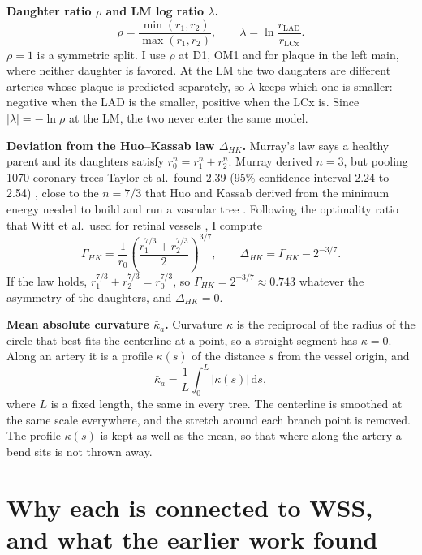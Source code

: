 \documentclass[11pt,a4paper]{article}
\begin{document}
\textbf{Daughter ratio $\rho$ and LM log ratio $\lambda$.}
\begin{equation}
  \rho = \frac{\min(r_1, r_2)}{\max(r_1, r_2)}, \qquad
  \lambda = \ln\frac{r_\mathrm{LAD}}{r_\mathrm{LCx}}.
  \label{eq:ratios}
\end{equation}
$\rho = 1$ is a symmetric split.
I use $\rho$ at D1, OM1 and for plaque in the left main, where neither daughter is favored.
At the LM the two daughters are different arteries whose plaque is predicted separately, so $\lambda$ keeps which one is smaller: negative when the LAD is the smaller, positive when the LCx is.
Since $\lvert\lambda\rvert = -\ln\rho$ at the LM, the two never enter the same model.

\textbf{Deviation from the Huo--Kassab law $\Delta_{HK}$.} Murray's law says a healthy parent and its daughters satisfy $r_0^n = r_1^n + r_2^n$.
Murray derived $n = 3$, but pooling 1070 coronary trees Taylor et al.\ found 2.39 (95\% confidence interval 2.24 to 2.54) \cite{taylor2024murray}, close to the $n = 7/3$ that Huo and Kassab derived from the minimum energy needed to build and run a vascular tree \cite{huo2012scaling}.
Following the optimality ratio that Witt et al.\ used for retinal vessels \cite{witt2010optimality}, I compute
\begin{equation}
  \Gamma_{HK} = \frac{1}{r_0}\left(\frac{r_1^{7/3} + r_2^{7/3}}{2}\right)^{3/7},
  \qquad
  \Delta_{HK} = \Gamma_{HK} - 2^{-3/7}.
  \label{eq:hk}
\end{equation}
If the law holds, $r_1^{7/3} + r_2^{7/3} = r_0^{7/3}$, so $\Gamma_{HK} = 2^{-3/7} \approx 0.743$ whatever the asymmetry of the daughters, and $\Delta_{HK} = 0$.

\textbf{Mean absolute curvature $\bar\kappa_a$.} Curvature $\kappa$ is the reciprocal of the radius of the circle that best fits the centerline at a point, so a straight segment has $\kappa = 0$.
Along an artery it is a profile $\kappa(s)$ of the distance $s$ from the vessel origin, and
\begin{equation}
  \bar\kappa_a = \frac{1}{L}\int_0^L \lvert\kappa(s)\rvert\,\mathrm{d}s,
  \label{eq:kappa}
\end{equation}
where $L$ is a fixed length, the same in every tree.
The centerline is smoothed at the same scale everywhere, and the stretch around each branch point is removed.
The profile $\kappa(s)$ is kept as well as the mean, so that where along the artery a bend sits is not thrown away.

\section{Why each is connected to WSS, and what the earlier work found}
\end{document}
